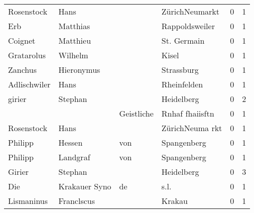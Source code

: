 \begin{center}
\begin{tiny}
\begin{longtabu}{llllrr}
               Rosenstock &                               Hans &             &                              ZürichNeumarkt &          0 &         1 \\
                      Erb &                           Matthias &             &                              Rappoldsweiler &          0 &         1 \\
                  Coignet &                           Matthieu &             &                                 St. Germain &          0 &         1 \\
               Gratarolus &                            Wilhelm &             &                                       Kisel &          0 &         1 \\
                  Zanchus &                         Hieronymus &             &                                  Strassburg &          0 &         1 \\
             Adlischwiler &                               Hans &             &                                 Rheinfelden &          0 &         1 \\
                   girier &                            Stephan &             &                                  Heidelberg &          0 &         2 \\
                          &                                    &  Geistliche &                             Rnhaf fhaiisftn &          0 &         1 \\
               Rosenstock &                               Hans &             &                             ZürichNeuma rkt &          0 &         1 \\
                  Philipp &                             Hessen &         von &                                 Spangenberg &          0 &         1 \\
                  Philipp &                           Landgraf &         von &                                 Spangenberg &          0 &         1 \\
                   Girier &                            Stephan &             &                                  Heidelberg &          0 &         3 \\
                      Die &                      Krakauer Syno &          de &                                        s.l. &          0 &         1 \\
               Lismaninus &                         Franclscus &             &                                      Krakau &          0 &         1 \\

\end{longtabu}
\end{tiny}
\end{center}
